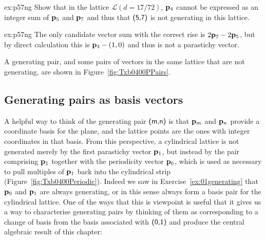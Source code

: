 \begin{jExercise}{ex:p57ng}
	Show that in the lattice $\mathcal{L}(d=17/72)$, ${\mathbf p}_{4}$ cannot be expressed as an integer sum of ${\mathbf p}_{5}$ and ${\mathbf p}_{7}$ and thus that $\textsf{(5,7)}$ is not generating in this lattice.
\end{jExercise}
\begin{jAnswer}{ex:p57ng}
	The only candidate vector sum with the correct rise is $2{\mathbf p}_{7}-2{\mathbf p}_{5}$, but by direct calculation this is ${\mathbf p}_{4}-(1,0)$ and thus is not a parastichy vector. 
\end{jAnswer}

A generating pair, and some pairs of vectors in the same lattice that are not generating, are shown in Figure~\ref{fig:Txb0400PPairs}.

\subsection{Generating pairs as basis vectors}
 A helpful way to think of the generating pair $\textsf{(m,n)}$ is that  ${\mathbf p}_{m}$ and ${\mathbf p}_{n}$ provide a coordinate basis for the plane, and the lattice points are the ones with integer coordinates in that basis. From this perspective, a cylindrical lattice is not generated merely by the first parastichy vector ${\mathbf p}_{1}$, but instead by  the pair comprising  ${\mathbf p}_{1}$ together with the periodicity vector ${\mathbf p}_{0}$, which is used as necessary to pull multiples of ${\mathbf p}_{1}$ back into the cylindrical strip (Figure~\ref{fig:Txb0400Periodic}).
 Indeed we saw in Exercise~\ref{ex:01generating} that ${\mathbf p}_{0}$ and ${\mathbf p}_{1}$ are always generating, or in this sense always form a basis pair for the cylindrical lattice. 
 One of the ways that this is viewpoint is useful  that it gives us a way to characterise generating pairs by thinking of them as corresponding to a change of basis from the basis associated with $\textsf{(0,1)}$ and produce the central algebraic result of this chapter:

